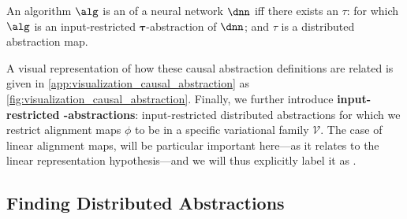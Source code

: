 \documentclass{article}
\newcommand{\bx}{\mathbf{x}}
\newcommand{\causalmap}{\phi}
\newcommand{\abstractionmap}{\tau}
\begin{document}
\begin{definition}\label{definition:input_restricted_constructive_abstraction}
An algorithm $\alg$ is an 
of a neural network $\dnn$ iff there exists an $\abstractionmap$:
for which $\alg$ is an input-restricted $\boldsymbol{\abstractionmap}$-abstraction of $\dnn$;
and $\abstractionmap$ is a distributed abstraction map.
\end{definition}

\newcommand{\calV}{\mathcal{V}}

A visual representation of how these causal abstraction definitions are related is given in \cref{app:visualization_causal_abstraction} as \cref{fig:visualization_causal_abstraction}.
Finally, we further introduce \textbf{input-restricted \boldsymbol{$\calV$}-abstractions}: input-restricted distributed abstractions for which we restrict alignment maps $\causalmap$ to be in a specific variational family $\calV$.
The case of linear alignment maps, will be particular important here---as it relates to the linear representation hypothesis---and we will thus explicitly label it as .

\subsection{Finding Distributed Abstractions}
\label{subsec:Finding_Distributed_Constructive_Abstractions}
\vspace{-2pt}

\newcommand{\nodesintervened}{\overline{\nodes}}
\newcommand{\xnode}{\bx_{\node}}
\mycgmacro{\notintervened}{\emptyset}
\newcommand{\xnotintervened}{\bx_{\notintervened}}

\newcommand{\xnodedata}{\xnodedata^{(n)}}
\newcommand{\xnotinterveneddata}{\xnotintervened^{(n)}}
\newcommand{\nodesinterveneddata}{\nodesintervened^{(n)}}
\newcommand{\interventiondata}{\interventions^{(n)}}
\newcommand{\bXintervened}{\mathbf{X}^{\nodesintervened}}
\newcommand{\powerset}{\mathcal{P}}
\end{document}
